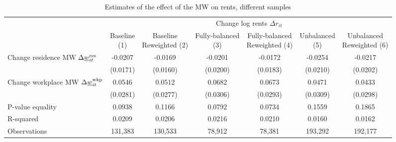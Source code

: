 \begin{landscape}
\begin{table}[hbt!]
    \centering
    \caption{Estimates of the effect of the MW on rents, different samples}
    \label{tab:static_sample}

    \begin{tabular}{@{}lcccccc@{}}
        \toprule
                                             & \multicolumn{6}{c}{Change log rents $\Delta r_{it}$}                   \\ \cmidrule(l){2-7} 
                                             & \shortstack{Baseline\\(1)}       & \shortstack{Baseline\\Reweighted (2)}
                                             & \shortstack{Fully-balanced\\(3)} & \shortstack{Fully-balanced\\Reweighted (4)}  
                                             & \shortstack{Unbalanced\\(5)}     & \shortstack{Unbalanced\\Reweighted (6)}  \\ \midrule
        Change residence MW 
                  $\Delta\underline{w}_{it}^{\text{res}}$    & -0.0207      & -0.0169        & -0.0201       & -0.0172    & -0.0254       & -0.0217     \\
                                             & (0.0171)    & (0.0160)      & (0.0200)     & (0.0183)  & (0.0210)     & (0.0202)   \\
        Change workplace MW 
                   $\Delta\underline{w}_{it}^{\text{wkp}}$   & 0.0546      & 0.0512        & 0.0682       & 0.0673    & 0.0471       & 0.0433     \\
                                             & (0.0281)    & (0.0277)      & (0.0306)     & (0.0293)  & (0.0309)     & (0.0298)   \\ \midrule
        P-value equality                     & 0.0938      & 0.1166        & 0.0792       & 0.0734    & 0.1559       & 0.1865     \\
        R-squared                            & 0.0209      & 0.0206        & 0.0216       & 0.0210    & 0.0160       & 0.0162     \\
        Observations                         & 131,383     & 130,533       & 78,912      & 78,381   & 193,292      & 192,177    \\ \bottomrule
    \end{tabular}


\end{table}
\end{landscape}
